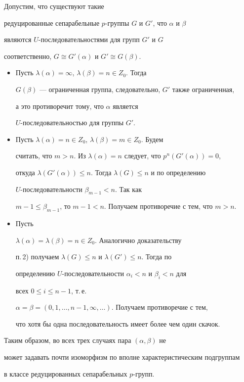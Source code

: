 \begin{pf}


Допустим, что существуют такие


редуцированные сепарабельные $p$-груп\-пы $G$ и $G'$, что $\alpha$ и $\beta$


являются $U$-последовательностями для групп $G'$ и $G$


соответственно, $G\cong G'(\alpha)$ и $G'\cong G(\beta)$.


\begin{itemize}


\item[1)] Пусть $\lambda(\alpha)=\infty$, $\lambda(\beta)=n\in Z_0$. Тогда


$G(\beta)$ --- ограниченная группа, следовательно, $G'$ также ограниченная,


а это противоречит тому, что $\alpha$ является


$U$-последовательностью для группы $G'$.


\item[2)] Пусть $\lambda(\alpha)=n\in Z_0$, $\lambda(\beta)=m\in Z_0$. Будем


считать, что $m>n$. Из $\lambda(\alpha)=n$ следует, что $p^n(G'(\alpha))=0$,


откуда $\lambda(G'(\alpha))\leq n$. Тогда $\lambda(G)\leq n$ и по определению


$U$-последовательности $\beta_{m-1}<n$. Так как


$m-1\leq\beta_{m-1}$, то $m-1<n$. Получаем противоречие с тем, что $m>n$.


\item[3)] Пусть


$\lambda(\alpha)=\lambda(\beta)=n\in Z_0$. Аналогично доказательству


п.\,2) получаем $\lambda(G)\leq n$ и $\lambda(G')\leq n$. Тогда по


определению $U$-последовательности $\alpha_i<n$ и $\beta_i<n$ для


всех $0\leq i\leq n-1$, т.\,е.\


$\alpha=\beta=(0,1,\dotsc,n-1,\infty,\dotsc)$. Получаем противоречие с тем,


что хотя бы одна последовательность имеет более чем один скачок.


\end{itemize}


Таким образом, во всех трех случаях пара $(\alpha,\beta)$ не


может задавать почти изоморфизм по вполне характеристическим подгруппам


в классе редуцированных сепарабельных $p$-групп.


\end{pf}





